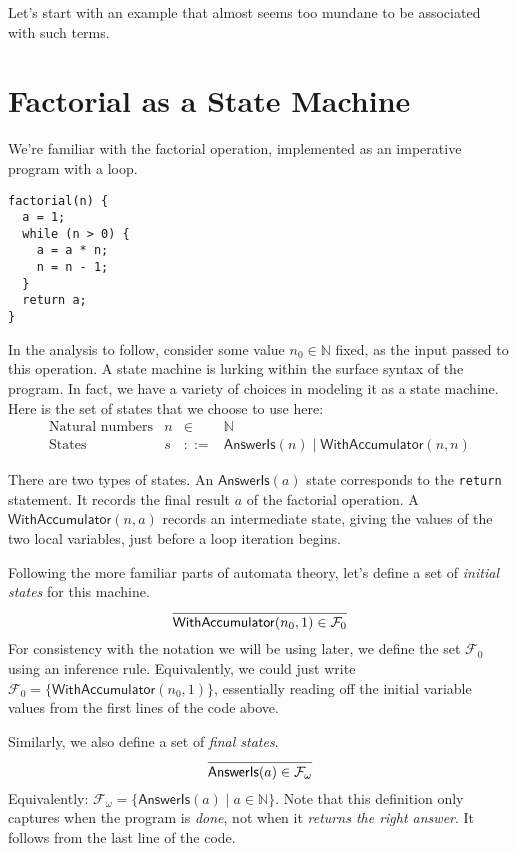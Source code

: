 \documentclass{amsbook}
\theoremstyle{definition}
\theoremstyle{remark}
\numberwithin{section}{chapter}
\numberwithin{equation}{chapter}
\begin{document}
Let's start with an example that almost seems too mundane to be associated with such terms.

\section{Factorial as a State Machine}

We're familiar with the factorial operation, implemented as an imperative program with a loop.
\begin{verbatim}
factorial(n) {
  a = 1;
  while (n > 0) {
    a = a * n;
    n = n - 1;
  }
  return a;
}
\end{verbatim}

In the analysis to follow, consider some value $n_0 \in \mathbb N$ fixed, as the input passed to this operation.
A state machine is lurking within the surface syntax of the program.
\encoding
In fact, we have a variety of choices in modeling it as a state machine.
Here is the set of states that we choose to use here:
$$\begin{array}{rrcl}
  \textrm{Natural numbers} & n &\in& \mathbb N \\
  \textrm{States} & s &::=& \mathsf{AnswerIs}(n) \mid \mathsf{WithAccumulator}(n, n)
\end{array}$$

There are two types of states.
An $\mathsf{AnswerIs}(a)$ state corresponds to the \texttt{return} statement.
It records the final result $a$ of the factorial operation.
A $\mathsf{WithAccumulator}(n, a)$ records an intermediate state, giving the values of the two local variables, just before a loop iteration begins.

Following the more familiar parts of automata theory, let's define a set of \emph{initial states} for this machine.
$$\infer{\mathsf{WithAccumulator}(n_0, 1) \in \mathcal F_0}{}$$
For consistency with the notation we will be using later, we define the set $\mathcal F_0$ using an inference rule.
Equivalently, we could just write $\mathcal F_0 = \{\mathsf{WithAccumulator}(n_0, 1)\}$, essentially reading off the initial variable values from the first lines of the code above.

Similarly, we also define a set of \emph{final states}.
$$\infer{\mathsf{AnswerIs}(a) \in \mathcal F_\omega}{}$$
Equivalently: $\mathcal F_\omega = \{\mathsf{AnswerIs}(a) \mid a \in \mathbb N\}$.
Note that this definition only captures when the program is \emph{done}, not when it \emph{returns the right answer}.
It follows from the last line of the code.
\end{document}
